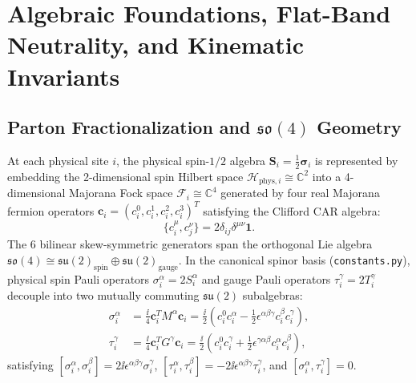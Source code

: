 \section{Algebraic Foundations, Flat-Band Neutrality, and Kinematic Invariants}
\label{sec:algebra_and_invariants}

\subsection{Parton Fractionalization and $\mathfrak{so}(4)$ Geometry}
At each physical site $i$, the physical spin-$1/2$ algebra $\mathbf{S}_i = \frac{1}{2} \boldsymbol{\sigma}_i$ is represented by embedding the 2-dimensional spin Hilbert space $\mathcal{H}_{\mathrm{phys}, i} \cong \mathbb{C}^2$ into a 4-dimensional Majorana Fock space $\mathcal{F}_i \cong \mathbb{C}^4$ generated by four real Majorana fermion operators $\mathbf{c}_i = (c_i^0, c_i^1, c_i^2, c_i^3)^T$ satisfying the Clifford CAR algebra:
\begin{equation}
\label{eq:car_algebra}
\{c_i^\mu, c_j^\nu\} = 2 \delta_{ij} \delta^{\mu\nu} \mathbf{1}.
\end{equation}
The 6 bilinear skew-symmetric generators span the orthogonal Lie algebra $\mathfrak{so}(4) \cong \mathfrak{su}(2)_{\mathrm{spin}} \oplus \mathfrak{su}(2)_{\mathrm{gauge}}$. In the canonical spinor basis (\texttt{constants.py}), physical spin Pauli operators $\sigma_i^\alpha = 2 S_i^\alpha$ and gauge Pauli operators $\tau_i^\gamma = 2 T_i^\gamma$ decouple into two mutually commuting $\mathfrak{su}(2)$ subalgebras:
\begin{align}
\sigma_i^\alpha &= \frac{\ii}{4} \mathbf{c}_i^T M^\alpha \mathbf{c}_i = \frac{\ii}{2} \left( c_i^0 c_i^\alpha - \frac{1}{2} \epsilon^{\alpha\beta\gamma} c_i^\beta c_i^\gamma \right), \label{eq:spin_algebra} \\
\tau_i^\gamma &= \frac{\ii}{4} \mathbf{c}_i^T G^\gamma \mathbf{c}_i = \frac{\ii}{2} \left( c_i^0 c_i^\gamma + \frac{1}{2} \epsilon^{\gamma\alpha\beta} c_i^\alpha c_i^\beta \right), \label{eq:gauge_algebra}
\end{align}
satisfying $[\sigma_i^\alpha, \sigma_i^\beta] = 2\ii \epsilon^{\alpha\beta\gamma} \sigma_i^\gamma$, $[\tau_i^\alpha, \tau_i^\beta] = -2\ii \epsilon^{\alpha\beta\gamma} \tau_i^\gamma$, and $[\sigma_i^\alpha, \tau_i^\gamma] = 0$.

